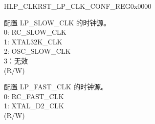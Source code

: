 \begin{register}{H}{LP\_CLKRST\_LP\_CLK\_CONF\_REG}{0x0000}\label{regdesc:LPCLKRSTLPCLKCONFREG}
%
%
%
\regnewline%
\begin{regdesc}\begin{reglist}
\label{fielddesc:LPCLKRSTSLOWCLKSEL}\item [LP\_CLKRST\_SLOW\_CLK\_SEL] 配置 LP\_SLOW\_CLK 的时钟源。\\ 
0: RC\_SLOW\_CLK \\ 
1: XTAL32K\_CLK \\ 
2: OSC\_SLOW\_CLK \\ 
3：无效  \\ (R/W) 
\label{fielddesc:LPCLKRSTFASTCLKSEL}\item [LP\_CLKRST\_FAST\_CLK\_SEL] 配置 LP\_FAST\_CLK 的时钟源。\\ 
0: RC\_FAST\_CLK \\ 
1: XTAL\_D2\_CLK  \\ (R/W)


\end{reglist}\end{regdesc}
\end{register}


